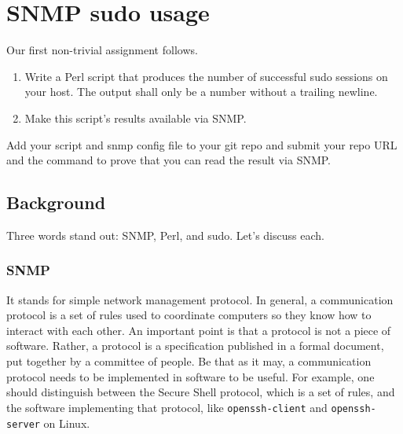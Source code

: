 \documentclass{article}
\begin{document}
\clearpage



\section{SNMP sudo usage}

Our first non-trivial assignment follows. %

\begin{enumerate}

	\item

		Write a Perl script that produces the number of successful sudo
		sessions on your host. The output shall only be a number without
		a trailing newline.

	\item Make this script's results available via SNMP.

\end{enumerate}
%
Add your script and snmp config file to your git repo and submit your repo URL
and the command to prove that you can read the result via SNMP.


\subsection{Background}

Three words stand out: SNMP, Perl, and sudo. Let's discuss each.

\subsubsection{SNMP}

It stands for simple network management protocol.  In general, a communication
protocol is a set of rules used to coordinate computers so they know how to
interact with each other. An important point is that a protocol is not a piece
of software.  Rather, a protocol is a specification published in a formal
document, put together by a committee of people.  Be that as it may, a
communication protocol needs to be implemented in software to be useful.  For
example, one should distinguish between  the Secure Shell protocol, which is a
set of rules, and the software implementing that protocol, like
\verb|openssh-client| and \verb|openssh-server| on Linux.
\end{document}
